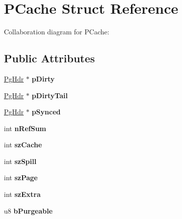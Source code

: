 \hypertarget{structPCache}{}\section{P\+Cache Struct Reference}
\label{structPCache}


Collaboration diagram for P\+Cache\+:
\subsection*{Public Attributes}
\begin{DoxyCompactItemize}
\item 
\hyperlink{structPgHdr}{Pg\+Hdr} $\ast$ {\bfseries p\+Dirty}\hypertarget{structPCache_a1c692ce92c7d3fc7c6c1324d5658b252}{}\label{structPCache_a1c692ce92c7d3fc7c6c1324d5658b252}

\item 
\hyperlink{structPgHdr}{Pg\+Hdr} $\ast$ {\bfseries p\+Dirty\+Tail}\hypertarget{structPCache_a8eaca309bfb8fa49e7c5e77dd3398bb0}{}\label{structPCache_a8eaca309bfb8fa49e7c5e77dd3398bb0}

\item 
\hyperlink{structPgHdr}{Pg\+Hdr} $\ast$ {\bfseries p\+Synced}\hypertarget{structPCache_a607eabd6768dd8df47d8fa353542b106}{}\label{structPCache_a607eabd6768dd8df47d8fa353542b106}

\item 
int {\bfseries n\+Ref\+Sum}\hypertarget{structPCache_a9688476c9cab5a7af8d09860567759eb}{}\label{structPCache_a9688476c9cab5a7af8d09860567759eb}

\item 
int {\bfseries sz\+Cache}\hypertarget{structPCache_a93ed4b9d731d883c3ed22a5adfd9c636}{}\label{structPCache_a93ed4b9d731d883c3ed22a5adfd9c636}

\item 
int {\bfseries sz\+Spill}\hypertarget{structPCache_abd30c4610f4087dad64f75e6c4e1e332}{}\label{structPCache_abd30c4610f4087dad64f75e6c4e1e332}

\item 
int {\bfseries sz\+Page}\hypertarget{structPCache_abb0bd0a3292780dcc07cb59bc577990d}{}\label{structPCache_abb0bd0a3292780dcc07cb59bc577990d}

\item 
int {\bfseries sz\+Extra}\hypertarget{structPCache_abcb37fcd3ea098b98a196a3f69e3c135}{}\label{structPCache_abcb37fcd3ea098b98a196a3f69e3c135}

\item 
u8 {\bfseries b\+Purgeable}\hypertarget{structPCache_a87ff1d0738734375524e544cefa33b01}{}\label{structPCache_a87ff1d0738734375524e544cefa33b01}


\end{DoxyCompactItemize}
